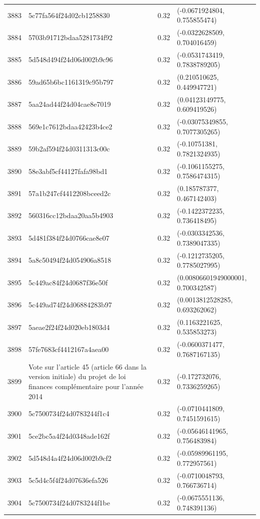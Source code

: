 \begin{table}[ht]
\begin{tabular}{rlrl}
  3883 & 5c77fa564f24d02cb1258830 & 0.32 & (-0.0671924804, 0.755855474) \\ 
  3884 & 5703b91712bdaa5281734f92 & 0.32 & (-0.0322628509, 0.704016459) \\ 
  3885 & 5d548d494f24d06d002b9c96 & 0.32 & (-0.0531743419, 0.7838789205) \\ 
  3886 & 59ad65b6bc1161319c95b797 & 0.32 & (0.210510625, 0.449947721) \\ 
  3887 & 5aa24ad44f24d04cae8e7019 & 0.32 & (0.04123149775, 0.609419526) \\ 
  3888 & 569e1c7612bdaa42423b4ce2 & 0.32 & (-0.03075349855, 0.7077305265) \\ 
  3889 & 59b2af594f24d0311313c00c & 0.32 & (-0.10751381, 0.7821324935) \\ 
  3890 & 58e3abf5cf44127fafa98bd1 & 0.32 & (-0.1061155275, 0.7586474315) \\ 
  3891 & 57a1b247cf4412208bceed2c & 0.32 & (0.185787377, 0.467142403) \\ 
  3892 & 560316cc12bdaa20aa5b4903 & 0.32 & (-0.1422372235, 0.736418495) \\ 
  3893 & 5d481f384f24d0766cae8e07 & 0.32 & (-0.0303342536, 0.7389047335) \\ 
  3894 & 5a8c50494f24d054906a8518 & 0.32 & (-0.1212735205, 0.7785027995) \\ 
  3895 & 5c449ac84f24d0687f36e50f & 0.32 & (0.00806601949000001, 0.700342587) \\ 
  3896 & 5c449ad74f24d06884283b97 & 0.32 & (0.0013812528285, 0.693262062) \\ 
  3897 & 5aeae2f24f24d020eb1803d4 & 0.32 & (0.1163221625, 0.535853273) \\ 
  3898 & 57fe7683cf4412167a4aea00 & 0.32 & (-0.0600371477, 0.7687167135) \\ 
  3899 & Vote sur l'article 45 (article 66 dans la version initiale) du projet de loi finances complémentaire pour l'année 2014 & 0.32 & (-0.172732076, 0.7336259265) \\ 
  3900 & 5c7500734f24d0783244f1c4 & 0.32 & (-0.0710441809, 0.7451591615) \\ 
  3901 & 5ce2bc5a4f24d0348ade162f & 0.32 & (-0.05646141965, 0.756483984) \\ 
  3902 & 5d548d4a4f24d06d002b9cf2 & 0.32 & (-0.05989961195, 0.772957561) \\ 
  3903 & 5c5d4c5f4f24d07636efa526 & 0.32 & (-0.0710048793, 0.766736714) \\ 
  3904 & 5c7500734f24d0783244f1be & 0.32 & (-0.0675551136, 0.748391136) \\ 

\end{tabular}
\end{table}
